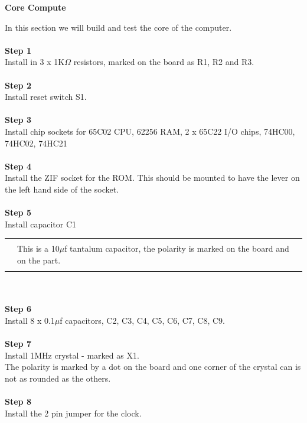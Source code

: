 \documentclass{ol-softwaremanual}
\newcommand{\Note}[1]{
\begin{table}[h]
\begin{tabular}{|p{0.1\textwidth}p{0.8\textwidth}|}
\hline
 & \\
\multicolumn{1}{|r}{\Huge\warning} & #1\\
 &  \\ \hline
\end{tabular}
\end{table}
}
\begin{document}
\begin{ffcode}
\pagebreak
\begin{center}
\textbf{Core Compute}
\end{center}
In this section we will build and test the core of the computer.\\
\\
\textbf{Step 1}\\
Install in 3 x 1K$\Omega$ resistors, marked on the board as R1, R2 and R3.\\
\\
\textbf{Step 2}\\
Install reset switch S1.\\
\\
\textbf{Step 3}\\
Install chip sockets for 65C02 CPU, 62256 RAM, 2 x 65C22 I/O chips, 74HC00, 74HC02, 74HC21\\
\\
\textbf{Step 4}\\
Install the ZIF socket for the ROM. This should be mounted to have the lever on the left hand side of the socket.\\
\\
\textbf{Step 5}\\
Install capacitor C1
\Note{This is a 10$\mu$f tantalum capacitor, the polarity is marked on the board and on the part.}\\
\\
\textbf{Step 6}\\
Install 8 x 0.1$\mu$f capacitors, C2, C3, C4, C5, C6, C7, C8, C9.\\
\\
\textbf{Step 7}\\
Install 1MHz crystal - marked as X1.\\
The polarity is marked by a dot on the board and one corner of the crystal can is not as rounded as the others.\\
\\
\textbf{Step 8}\\
Install the 2 pin jumper for the clock.\\
\\
\pagebreak


\end{ffcode}
\end{document}
